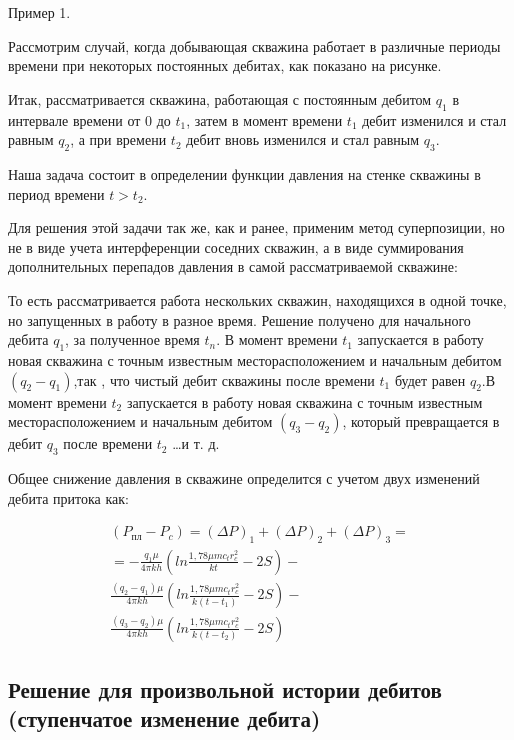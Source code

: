 Пример 1.

Рассмотрим случай, когда добывающая скважина работает в различные периоды времени при некоторых постоянных дебитах, как показано на рисунке.  



Итак, рассматривается скважина, работающая с постоянным дебитом $q_1$ в интервале времени от 0 до $t_1$, затем в момент времени $t_1$ дебит изменился и стал равным $q_2$, а при времени $t_2$ дебит вновь изменился и стал равным $q_3$.

Наша задача состоит в определении функции давления на стенке скважины в период времени $t>t_2$.

Для решения этой задачи так же, как и ранее, применим метод суперпозиции, но не в виде учета интерференции соседних скважин, а в виде суммирования дополнительных перепадов давления в самой рассматриваемой скважине:

То есть рассматривается работа нескольких скважин, находящихся в одной точке, но запущенных в работу в разное время. Решение получено для начального дебита $q_1$, за полученное время $t_n$. В момент времени $t_1$ запускается в работу новая скважина с точным известным месторасположением и начальным дебитом $ \left(q_2 - q_1\right)$,так , что чистый дебит скважины после времени  $t_1$ будет равен  $q_2$.В момент времени $t_2$ запускается в работу новая скважина с точным известным месторасположением и начальным дебитом $ \left(q_3 - q_2\right)$, который превращается в дебит $q_3$ после времени $t_2$ …и т. д.

Общее снижение давления в скважине определится с учетом двух изменений дебита притока как:

\begin{eqnarray}
	\left( P_{пл} - P_c\right) = \left( \Delta P\right)_1 + \left( \Delta P\right)_2 +\left( \Delta P\right)_3 = \nonumber  \\ 
	= - \frac{q_1 \mu}{4\pi kh} \left( ln \frac{1,78 \mu m c_t r_c^2}{kt}-2S \right) - \nonumber  \\ 
	\frac{ \left(q_2 - q_1\right)\mu}{4\pi kh} \left( ln \frac{1,78 \mu m c_t r_c^2}{k\left(t-t_1\right)}-2S \right)- \nonumber  \\ 
	\frac{ \left(q_3 - q_2\right)\mu}{4\pi kh} \left( ln \frac{1,78 \mu m c_t r_c^2}{k\left(t-t_2\right)}-2S \right)
\end{eqnarray}

\subsection{Решение для произвольной истории дебитов (ступенчатое изменение дебита)} 


